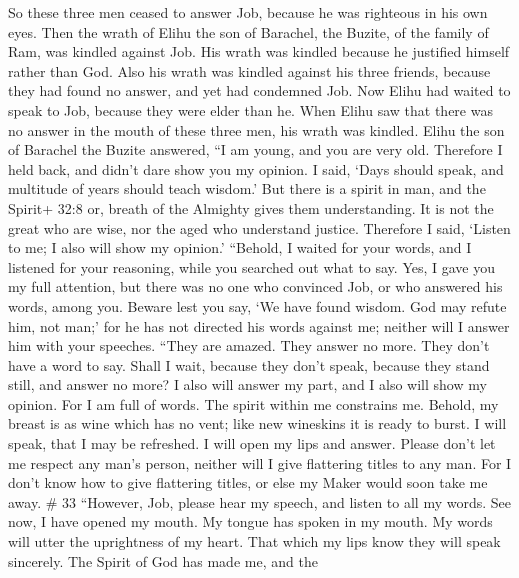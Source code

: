  So these three men ceased to answer Job, because he was
righteous in his own eyes.  Then the wrath of Elihu the son
of Barachel, the Buzite, of the family of Ram, was kindled against Job.
His wrath was kindled because he justified himself rather than God.
 Also his wrath was kindled against his three friends,
because they had found no answer, and yet had condemned Job.
 Now Elihu had waited to speak to Job, because they were
elder than he.  When Elihu saw that there was no answer in
the mouth of these three men, his wrath was kindled.  Elihu
the son of Barachel the Buzite answered, ``I am young, and you are very
old. Therefore I held back, and didn't dare show you my opinion.
 I said, `Days should speak, and multitude of years should
teach wisdom.'  But there is a spirit in man, and the
Spirit+ 32:8 or, breath of the Almighty gives them understanding.
 It is not the great who are wise, nor the aged who
understand justice.  Therefore I said, `Listen to me; I
also will show my opinion.'  ``Behold, I waited for your
words, and I listened for your reasoning, while you searched out what to
say.  Yes, I gave you my full attention, but there was no
one who convinced Job, or who answered his words, among you.
 Beware lest you say, `We have found wisdom. God may refute
him, not man;'  for he has not directed his words against
me; neither will I answer him with your speeches.  ``They
are amazed. They answer no more. They don't have a word to say.
 Shall I wait, because they don't speak, because they stand
still, and answer no more?  I also will answer my part, and
I also will show my opinion.  For I am full of words. The
spirit within me constrains me.  Behold, my breast is as
wine which has no vent; like new wineskins it is ready to burst.
 I will speak, that I may be refreshed. I will open my lips
and answer.  Please don't let me respect any man's person,
neither will I give flattering titles to any man.  For I
don't know how to give flattering titles, or else my Maker would soon
take me away. \# 33  ``However, Job, please hear my speech,
and listen to all my words.  See now, I have opened my
mouth. My tongue has spoken in my mouth.  My words will
utter the uprightness of my heart. That which my lips know they will
speak sincerely.  The Spirit of God has made me, and the
